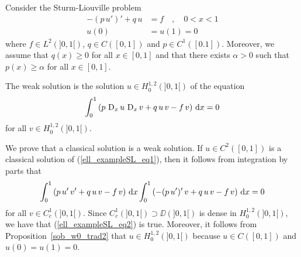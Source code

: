 \begin{egg}
Consider the Sturm-Liouville problem
\begin{equation} \label{ell_exampleSL_eq1}
\begin{split}
-(p\, u')' + q\,u &= f \quad , \quad 0<x < 1 \\
u(0)&= u(1)=0
\end{split}
\end{equation}
where $\displaystyle f\in L^2(]0,1[)$, $q\in C([0,1])$ and
$\displaystyle p\in C^1([0.1])$.
Moreover, we assume that $q(x)\geq 0$ for all $x\in [0,1]$ and that
there exists $\alpha>0$ such that $p(x) \geq \alpha$ for all
$x\in[0,1]$.   \label{ell_exampleSL}

The weak solution is the solution $\displaystyle u\in H^{1,2}_0(]0,1[)$ of the
equation
\begin{equation} \label{ell_exampleSL_eq2}
\int_0^1 \left( p\, \operatorname{D}_x u \, \operatorname{D}_x v + q\, u\, v
- f\, v \right) \,\mathrm{d}{x} = 0
\end{equation}
for all $\displaystyle v \in H^{1,2}_0(]0,1[)$.

We prove that a classical solution is a weak solution.  
If $\displaystyle u\in C^2([0,1])$ is a classical solution of
(\ref{ell_exampleSL_eq1}), then it follows from integration by parts that
\[
\int_0^1 \left( p\,u'\, v' + q\, u\, v - f\, v \right) \,\mathrm{d}{x}
\int_0^1 \left( -(p\,u')'\, v + q\, u\, v - f\, v \right) \,\mathrm{d}{x} = 0
\]
for all $\displaystyle v \in C^1_c(]0,1[)$.   Since
$\displaystyle C^1_c(]0,1[) \supset \DD(]0,1[)$ is dense in
$\displaystyle H^{1,2}_0(]0,1[)$, we have that
(\ref{ell_exampleSL_eq2}) is true.  Moreover, it follows from 
Proposition~\ref{sob_w0_trad2} that
$\displaystyle u\in H^{1,2}_0(]0,1[)$ because
$u\in C([0,1])$ and $u(0)=u(1)=0$.


\end{egg}
